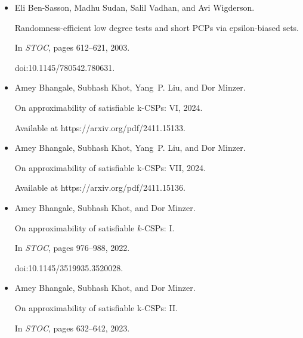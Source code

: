 \begin{itemize}
\emph{Random Structures Algorithms}, 32(1):49–70, 2008.


(also in APPROX-RANDOM 2004).


doi:10.1002/RSA.20182.





\item[] 
[6]

Eli Ben-Sasson, Madhu Sudan, Salil Vadhan, and Avi Wigderson.


Randomness-efficient low degree tests and short PCPs via
epsilon-biased sets.


In \emph{STOC}, pages 612–621, 2003.


doi:10.1145/780542.780631.





\item[] 
[7]

Amey Bhangale, Subhash Khot, Yang P. Liu, and Dor Minzer.


On approximability of satisfiable k-CSPs: VI, 2024.


Available at https://arxiv.org/pdf/2411.15133.





\item[] 
[8]

Amey Bhangale, Subhash Khot, Yang P. Liu, and Dor Minzer.


On approximability of satisfiable k-CSPs: VII, 2024.


Available at https://arxiv.org/pdf/2411.15136.





\item[] 
[9]

Amey Bhangale, Subhash Khot, and Dor Minzer.


On approximability of satisfiable $k$-CSPs: I.


In \emph{STOC}, pages 976–988, 2022.


doi:10.1145/3519935.3520028.





\item[] 
[10]

Amey Bhangale, Subhash Khot, and Dor Minzer.


On approximability of satisfiable k-CSPs: II.


In \emph{STOC}, pages 632–642, 2023.



\end{itemize}
